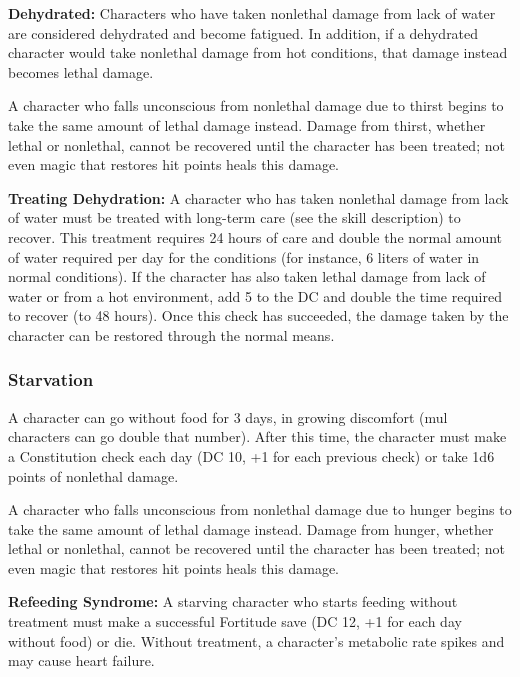 \textbf{Dehydrated:} Characters who have taken nonlethal damage from lack of water are considered dehydrated and become fatigued. In addition, if a dehydrated character would take nonlethal damage from hot conditions, that damage instead becomes lethal damage.

A character who falls unconscious from nonlethal damage due to thirst begins to take the same amount of lethal damage instead. Damage from thirst, whether lethal or nonlethal, cannot be recovered until the character has been treated; not even magic that restores hit points heals this damage.

\textbf{Treating Dehydration:} A character who has taken nonlethal damage from lack of water must be treated with long-term care (see the  skill description) to recover. This treatment requires 24 hours of care and double the normal amount of water required per day for the conditions (for instance, 6 liters of water in normal conditions). If the character has also taken lethal damage from lack of water or from a hot environment, add 5 to the  DC and double the time required to recover (to 48 hours). Once this  check has succeeded, the damage taken by the character can be restored through the normal means.


\subsubsection{Starvation}
A character can go without food for 3 days, in growing discomfort (mul characters can go double that number). After this time, the character must make a Constitution check each day (DC 10, +1 for each previous check) or take 1d6 points of nonlethal damage.

A character who falls unconscious from nonlethal damage due to hunger begins to take the same amount of lethal damage instead. Damage from hunger, whether lethal or nonlethal, cannot be recovered until the character has been treated; not even magic that restores hit points heals this damage.

\textbf{Refeeding Syndrome:} A starving character who starts feeding without treatment must make a successful Fortitude save (DC 12, +1 for each day without food) or die. Without treatment, a character's metabolic rate spikes and may cause heart failure.

